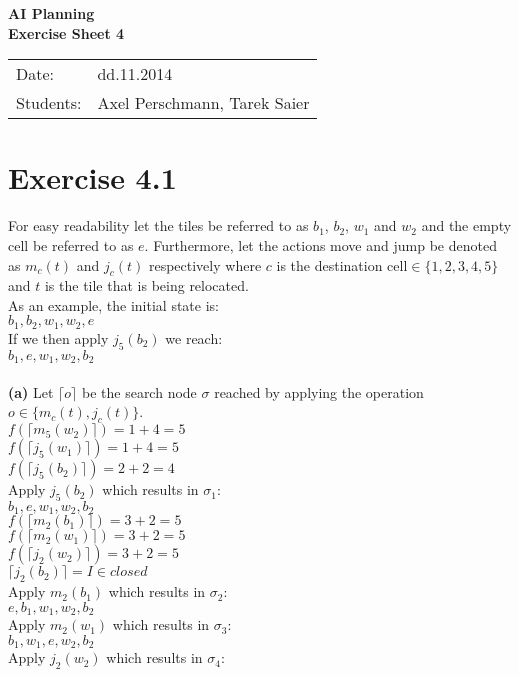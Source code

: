 \documentclass[11pt,a4paper]{article}
\begin{document}
\begin{center}
\Huge{\textbf{AI Planning}}\\
\LARGE{\textbf{Exercise Sheet 4}}
\end{center}
\vspace{2cm}
\begin{tabular}{ll}
Date: & dd.11.2014\\
Students: & Axel Perschmann, Tarek Saier
\end{tabular}

\section*{Exercise 4.1}
For easy readability let the tiles be referred to as $b_1$, $b_2$, $w_1$ and $w_2$ and the empty cell be referred to as $e$. Furthermore, let the actions move and jump be denoted as $m_c(t)$ and $j_c(t)$ respectively where $c$ is the destination cell$\in \{1,2,3,4,5\}$ and $t$ is the tile that is being relocated.\\
As an example, the initial state is:\\
$b_1,b_2,w_1,w_2,e$\\
If we then apply $j_5(b_2)$ we reach:\\
$b_1,e,w_1,w_2,b_2$\\
\\
\textbf{(a)} Let $\lceil o\rceil$ be the search node $\sigma$ reached by applying the operation $o\in \{m_c(t),j_c(t)\}$.\\
$f(\lceil m_5(w_2)\rceil)=1+4=5$\\
$f(\lceil j_5(w_1)\rceil)=1+4=5$\\
$f(\lceil j_5(b_2)\rceil)=2+2=4$\\
Apply $j_5(b_2)$ which results in $\sigma_1$:\\
$b_1,e,w_1,w_2,b_2$\\
$f(\lceil m_2(b_1)\rceil)=3+2=5$\\
$f(\lceil m_2(w_1)\rceil)=3+2=5$\\
$f(\lceil j_2(w_2)\rceil)=3+2=5$\\
$\lceil j_2(b_2)\rceil=I\in closed$\\
Apply $m_2(b_1)$ which results in $\sigma_2$:\\
$e,b_1,w_1,w_2,b_2$\\
Apply $m_2(w_1)$ which results in $\sigma_3$:\\
$b_1,w_1,e,w_2,b_2$\\
Apply $j_2(w_2)$ which results in $\sigma_4$:\\
\end{document}
